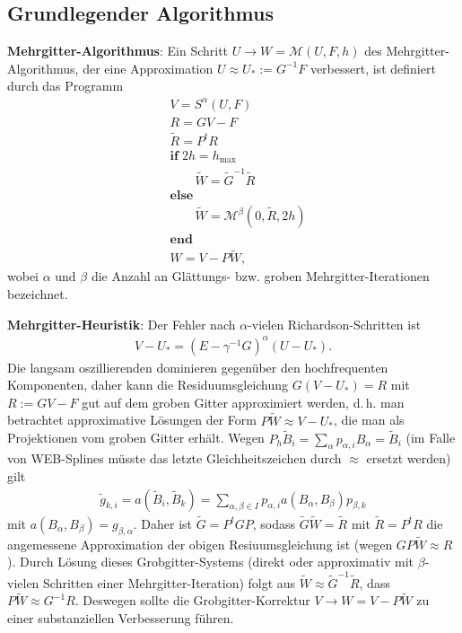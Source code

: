 \subsection{%
    Grundlegender Algorithmus%
}

\textbf{Mehrgitter-Algorithmus}:
Ein Schritt
$U \rightarrow W = \mathcal{M}(U, F, h)$
des Mehrgitter-Algorithmus, der eine Approximation $U \approx U_\ast := G^{-1} F$ verbessert,
ist definiert durch das Programm
\begin{align*}
    &V = S^\alpha(U, F)\\
    &R = GV - F\\
    &\widetilde{R} = P^t R\\
    &\mathbf{if}\; 2h = h_{\text{max}}\\
    &\qquad\widetilde{W} = \widetilde{G}^{-1} \widetilde{R}\\
    &\mathbf{else}\\
    &\qquad\widetilde{W} = \mathcal{M}^\beta(0, \widetilde{R}, 2h)\\
    &\mathbf{end}\\
    &W = V - P\widetilde{W},
\end{align*}
wobei $\alpha$ und $\beta$ die Anzahl an Glättungs- bzw. groben Mehrgitter-Iterationen bezeichnet.

\linie
\pagebreak

\textbf{Mehrgitter-Heuristik}:
Der Fehler nach $\alpha$-vielen Richardson-Schritten ist
\begin{align*}
    V - U_\ast = (E - \gamma^{-1} G)^\alpha (U - U_\ast).
\end{align*}
Die langsam oszillierenden dominieren
gegenüber den hochfrequenten Komponenten, daher kann die
Residuumsgleichung $G(V - U_\ast) = R$ mit $R := GV - F$
gut auf dem groben Gitter approximiert werden, d.\,h. man betrachtet approximative Lösungen
der Form $P\widetilde{W} \approx V - U_\ast$, die man als Projektionen vom groben Gitter erhält.
Wegen $P_h \widetilde{B}_i = \sum_\alpha p_{\alpha,i} B_\alpha = \widetilde{B}_i$
(im Falle von WEB-Splines müsste das letzte Gleichheitszeichen durch $\approx$ ersetzt werden)
gilt
\begin{align*}
    \widetilde{g}_{k,i}
    = a(\widetilde{B}_i, \widetilde{B}_k)
    = \sum_{\alpha,\beta \in I} p_{\alpha,i} a(B_\alpha, B_\beta) p_{\beta,k}
\end{align*}
mit $a(B_\alpha, B_\beta) = g_{\beta,\alpha}$.
Daher ist $\widetilde{G} = P^t G P$, sodass
$\widetilde{G} \widetilde{W} = \widetilde{R}$ mit $\widetilde{R} = P^t R$
die angemessene Approximation der obigen Resiuumsgleichung ist
(wegen $GP\widetilde{W} \approx R$).
Durch Lösung dieses Grobgitter-Systems
(direkt oder approximativ mit $\beta$-vielen Schritten einer Mehrgitter-Iteration)
folgt aus $\widetilde{W} \approx \widetilde{G}^{-1} \widetilde{R}$,
dass $P\widetilde{W} \approx G^{-1} R$.
Deswegen sollte die Grobgitter-Korrektur $V \rightarrow W = V - P\widetilde{W}$ zu einer
substanziellen Verbesserung führen.


